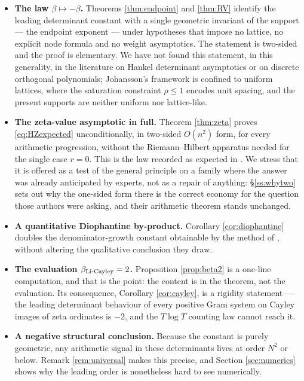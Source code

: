 \documentclass[11pt]{amsart}
\numberwithin{equation}{section}
\theoremstyle{plain}
\theoremstyle{definition}
\theoremstyle{remark}
\begin{document}
\begin{itemize}
\item \textbf{The law $\beta\mapsto-\beta$.} Theorems \ref{thm:endpoint} and \ref{thm:RV} identify
the leading determinant constant with a single geometric invariant of the support --- the endpoint
exponent --- under hypotheses that impose no lattice, no explicit node formula and no weight
asymptotics. The statement is two-sided and the proof is elementary. We have not found this
statement, in this generality, in the literature on Hankel determinant asymptotics or on discrete
orthogonal polynomials; Johansson's framework is confined to uniform lattices, where the saturation
constraint $\rho\le1$ encodes unit spacing, and the present supports are neither uniform nor
lattice-like.
\item \textbf{The zeta-value asymptotic in full.} Theorem \ref{thm:zeta} proves
\eqref{eq:HZexpected} unconditionally, in two-sided $O(n^{2})$ form, for every arithmetic
progression, without the Riemann--Hilbert apparatus needed for the single case $r=0$. This is the
law recorded as expected in \cite{HaynesZudilin2015}. We stress that it is offered as a test of the
general principle on a family where the answer was already anticipated by experts, not as a repair
of anything: \S\ref{ss:whytwo} sets out why the one-sided form there is the correct economy for the
question those authors were asking, and their arithmetic theorem stands unchanged.
\item \textbf{A quantitative Diophantine by-product.} Corollary \ref{cor:diophantine} doubles the
denominator-growth constant obtainable by the method of \cite{HaynesZudilin2015}, without altering
the qualitative conclusion they draw.
\item \textbf{The evaluation $\beta_{\mathrm{Li\text-Cayley}}=2$.} Proposition \ref{prop:beta2} is a
one-line computation, and that is the point: the content is in the theorem, not the evaluation. Its
consequence, Corollary \ref{cor:cayley}, is a rigidity statement --- the leading determinant
behaviour of every positive Gram system on Cayley images of zeta ordinates is $-2$, and the
$T\log T$ counting law cannot reach it.
\item \textbf{A negative structural conclusion.} Because the constant is purely geometric, any
arithmetic signal in these determinants lives at order $N^{2}$ or below. Remark \ref{rem:universal}
makes this precise, and Section \ref{sec:numerics} shows why the leading order is nonetheless hard
to see numerically.
\end{itemize}
\end{document}
